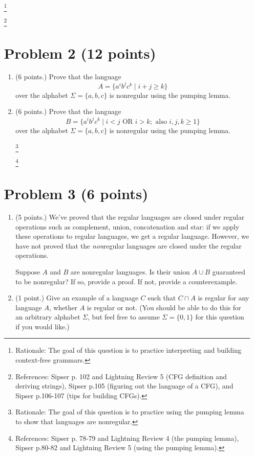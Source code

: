 \documentclass[letterpaper,11pt,twoside]{article}
\theoremstyle{plain}
\theoremstyle{definition}
\theoremstyle{remark}
\theoremstyle{restate}
\newcommand\blfootnote[1]{%
  \begingroup
  \renewcommand\thefootnote{}\footnote{#1}%
  \addtocounter{footnote}{-1}%
  \endgroup
}
\begin{document}
    \blfootnote{ Rationale: The goal of this question is to practice interpreting and building context-free grammars. }
    \blfootnote{ References: Sipser p. 102 and Lightning Review 5 (CFG definition and deriving strings), Sipser p.105 (figuring out the language of a CFG), and Sipser p.106-107 (tips for building CFGs). }


\clearpage
\section{Problem 2 (12 points)}

\begin{enumerate}
    \item (6 points.) Prove that the language
    \[
        A = \{a^i b^j c^k \; | \; i + j \geq k\}
    \]
    over the alphabet $\Sigma = \{a,b, c\}$ is nonregular using the pumping lemma.
    
    \item (6 points.) Prove that the language
    \[
        B = \{ a^i b^j c^k \; | \; i < j \text{ OR } i > k; \text{ also } i, j, k \geq 1 \}
    \]
    over the alphabet $\Sigma = \{a, b, c\}$ is nonregular using the pumping lemma.
    
    \blfootnote{ Rationale: The goal of this question is to practice using the pumping lemma to show that languages are nonregular. }
    \blfootnote{ References: Sipser p. 78-79 and Lightning Review 4 (the pumping lemma), Sipser p.80-82 and Lightning Review 5 (using the pumping lemma). }
\end{enumerate}

    
\clearpage
\section{Problem 3 (6 points)}
\begin{enumerate}
    \item (5 points.) We've proved that the regular languages are closed under regular operations such as complement, union, concatenation and star: if we apply these operations to regular languages, we get a regular language. However, we have not proved that the \emph{non}regular languages are closed under the regular operations. 
    
    Suppose $A$ and $B$ are nonregular languages. Is their union $A \cup B$ guaranteed to be nonregular? If so, provide a proof. If not, provide a counterexample.

    \item (1 point.) Give an example of a language $C$ such that $C \cap A$ is regular for any language $A$, whether $A$ is regular or not. (You should be able to do this for an arbitrary alphabet $\Sigma$, but feel free to assume $\Sigma = \{0,1\}$ for this question if you would like.)

\end{enumerate}
\end{document}
